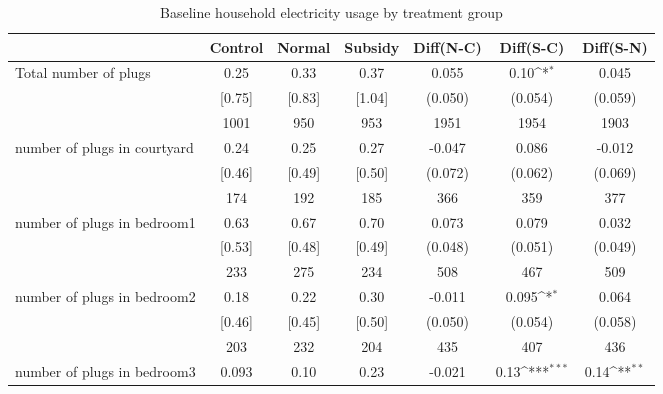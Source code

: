 \begin{table}[htbp]\centering
\def\sym#1{\ifmmode^{#1}\else\(^{#1}\)\fi}
\caption{Baseline household electricity usage by treatment group \label{tab:"balance"}}
\begin{tabular*}{1\hsize}{@{\hskip\tabcolsep\extracolsep\fill}l*{1}{cccccc}}
\toprule
                                &  Control&   Normal&  Subsidy&Diff(N-C)         &Diff(S-C)         &Diff(S-N)         \\
\midrule
Total number of plugs           &     0.25&     0.33&     0.37&    0.055         &     0.10\sym{*}  &    0.045         \\
                                &   [0.75]&   [0.83]&   [1.04]&  (0.050)         &  (0.054)         &  (0.059)         \\
                                &     1001&      950&      953&     1951         &     1954         &     1903         \\
number of plugs in courtyard    &     0.24&     0.25&     0.27&   -0.047         &    0.086         &   -0.012         \\
                                &   [0.46]&   [0.49]&   [0.50]&  (0.072)         &  (0.062)         &  (0.069)         \\
                                &      174&      192&      185&      366         &      359         &      377         \\
number of plugs in bedroom1     &     0.63&     0.67&     0.70&    0.073         &    0.079         &    0.032         \\
                                &   [0.53]&   [0.48]&   [0.49]&  (0.048)         &  (0.051)         &  (0.049)         \\
                                &      233&      275&      234&      508         &      467         &      509         \\
number of plugs in bedroom2     &     0.18&     0.22&     0.30&   -0.011         &    0.095\sym{*}  &    0.064         \\
                                &   [0.46]&   [0.45]&   [0.50]&  (0.050)         &  (0.054)         &  (0.058)         \\
                                &      203&      232&      204&      435         &      407         &      436         \\
number of plugs in bedroom3     &    0.093&     0.10&     0.23&   -0.021         &     0.13\sym{***}&     0.14\sym{**} \\

\end{tabular*}
\end{table}
